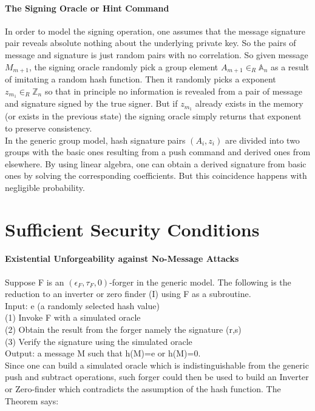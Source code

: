 \documentclass[18]{article}
\begin{document}
\paragraph{The Signing Oracle or Hint Command}
In order to model the signing operation, one assumes that the message signature pair reveals absolute nothing about the underlying private key. So the pairs of message and signature is just random pairs with no correlation. So given message $M_{m+1}$, the signing oracle randomly pick a group element $A_{m+1}\in _R\mathbb{A}_n$ as a result of imitating a random hash function.
Then it randomly picks a exponent $z_{m_1}\in _R\mathbb{Z}_n$ so that in principle no information is revealed from a pair of message and signature signed by the true signer. But if $z_{m_1}$ already exists in the memory (or exists in the previous state) the signing oracle simply returns that exponent to preserve consistency.\\
In the generic group model, hash signature pairs $(A_i,z_i)$ are divided into two groups with the basic ones resulting from a push command and derived ones from elsewhere. By using linear algebra, one can obtain a derived signature from basic ones by solving the corresponding coefficients. But this coincidence happens with negligible probability.

\section{Sufficient Security Conditions}
\paragraph{Existential Unforgeability against No-Message Attacks}
Suppose F is an $(\epsilon_F,\tau_F,0)$-forger in the generic model. The following is the reduction to an inverter or zero finder (I) using F as a subroutine.\\
Input: e (a randomly selected hash value)\\
(1) Invoke F with a simulated oracle\\
(2) Obtain the result from the forger namely the signature (r,s)\\
(3) Verify the signature using the simulated oracle\\
Output:  a message M such that h(M)=e or h(M)=0.\\
Since one can build a simulated oracle which is indistinguishable from the generic push and subtract operations, such forger could then be used to build an Inverter or Zero-finder which contradicts the assumption of the hash function.
The Theorem says:
\end{document}
